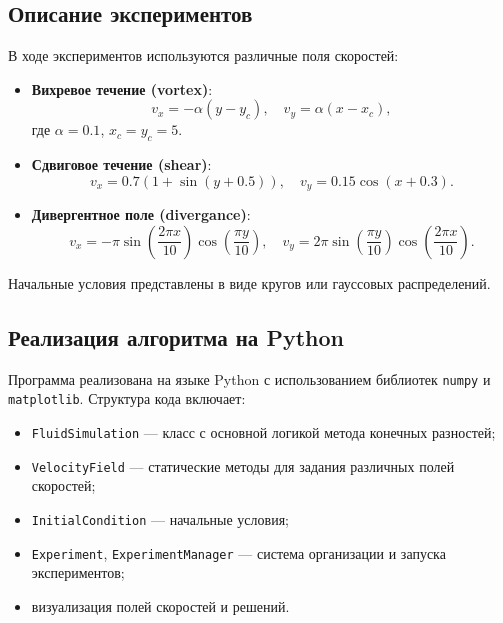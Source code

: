 \subsection{Описание экспериментов}

В ходе экспериментов используются различные поля скоростей:
\begin{itemize}
	\item \textbf{Вихревое течение (vortex)}:
	\begin{equation}
			v_x = -\alpha (y - y_c), \quad v_y = \alpha (x - x_c),
			\label{eq:vortex}
	\end{equation}
	где \(\alpha = 0.1\), \(x_c = y_c = 5\).
	
	\item \textbf{Сдвиговое течение (shear)}:
	\begin{equation}
			v_x = 0.7(1 + \sin(y + 0.5)), \quad v_y = 0.15 \cos(x + 0.3).
			\label{eq:shear}
	\end{equation}

	
	\item \textbf{Дивергентное поле (divergance)}:
	\begin{equation}
			v_x = -\pi \sin\left( \frac{2\pi x}{10} \right) \cos\left( \frac{\pi y}{10} \right), \quad
		v_y = 2\pi \sin\left( \frac{\pi y}{10} \right) \cos\left( \frac{2\pi x}{10} \right).
		\label{eq:div}
	\end{equation}

\end{itemize}

Начальные условия представлены в виде кругов или гауссовых распределений.

\subsection{Реализация алгоритма на Python}

Программа реализована на языке Python с использованием библиотек \texttt{numpy} и \texttt{matplotlib}. Структура кода включает:
\begin{itemize}
	\item \texttt{FluidSimulation} — класс с основной логикой метода конечных разностей;
	\item \texttt{VelocityField} — статические методы для задания различных полей скоростей;
	\item \texttt{InitialCondition} — начальные условия;
	\item \texttt{Experiment}, \texttt{ExperimentManager} — система организации и запуска экспериментов;
	\item визуализация полей скоростей и решений.
\end{itemize}


